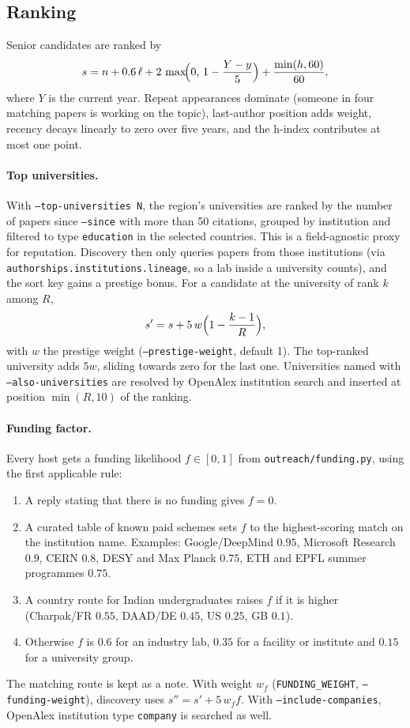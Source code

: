 \documentclass[11pt,a4paper]{article}
\newcommand{\code}[1]{\texttt{#1}}
\begin{document}
\subsection{Ranking}
Senior candidates are ranked by
\[
  s = n + 0.6\,\ell + 2\,\max\!\Bigl(0,\, 1 - \frac{Y - y}{5}\Bigr) + \frac{\min(h, 60)}{60},
\]
where $Y$ is the current year. Repeat appearances dominate (someone in four matching papers is
working on the topic), last-author position adds weight, recency decays linearly to zero over
five years, and the h-index contributes at most one point.

\paragraph{Top universities.} With \code{--top-universities N}, the region's universities are
ranked by the number of papers since \code{--since} with more than 50 citations, grouped by
institution and filtered to type \code{education} in the selected countries. This is a
field-agnostic proxy for reputation. Discovery then only queries papers from those institutions
(via \code{authorships.institutions.lineage}, so a lab inside a university counts), and the sort
key gains a prestige bonus. For a candidate at the university of rank $k$ among $R$,
\[
  s' = s + 5\,w \Bigl(1 - \frac{k-1}{R}\Bigr),
\]
with $w$ the prestige weight (\code{--prestige-weight}, default 1). The top-ranked university
adds $5w$, sliding towards zero for the last one. Universities named with
\code{--also-universities} are resolved by OpenAlex institution search and inserted at position
$\min(R, 10)$ of the ranking.

\paragraph{Funding factor.} Every host gets a funding likelihood $f \in [0,1]$ from
\code{outreach/funding.py}, using the first applicable rule:
\begin{enumerate}
  \item A reply stating that there is no funding gives $f = 0$.
  \item A curated table of known paid schemes sets $f$ to the highest-scoring match on the
        institution name. Examples: Google/DeepMind $0.95$, Microsoft Research $0.9$, CERN
        $0.8$, DESY and Max Planck $0.75$, ETH and EPFL summer programmes $0.75$.
  \item A country route for Indian undergraduates raises $f$ if it is higher (Charpak/FR $0.55$,
        DAAD/DE $0.45$, US $0.25$, GB $0.1$).
  \item Otherwise $f$ is $0.6$ for an industry lab, $0.35$ for a facility or institute and $0.15$
        for a university group.
\end{enumerate}
The matching route is kept as a note. With weight $w_f$ (\code{FUNDING\_WEIGHT},
\code{--funding-weight}), discovery uses $s'' = s' + 5\,w_f f$. With
\code{--include-companies}, OpenAlex institution type \code{company} is searched as well.
\end{document}

